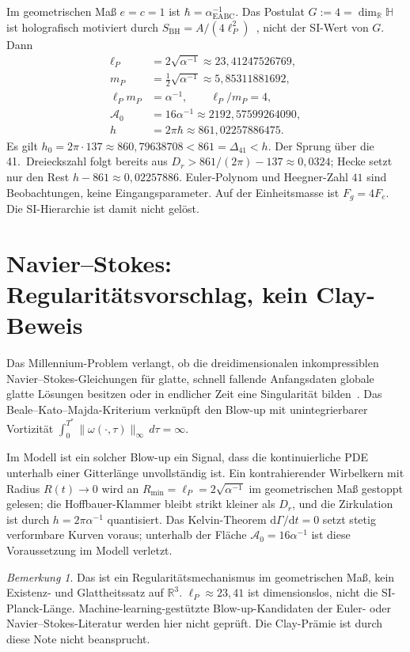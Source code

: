 \documentclass[11pt,a4paper]{article}
\theoremstyle{definition}
\theoremstyle{remark}
\newtheorem{remark}[theorem]{Bemerkung}
\numberwithin{equation}{section}
\begin{document}
Im geometrischen Maß $e=c=1$ ist $\hbar=\alpha^{-1}_{\mathrm{EABC}}$.
Das Postulat $G:=4=\dim_{\mathbb{R}}\mathbb{H}$ ist holografisch motiviert durch $S_{\mathrm{BH}}=A/(4\ell_P^2)$~\cite{bekenstein1973,hawking1975}, nicht der SI-Wert von $G$.
Dann
\begin{align}
\ell_P&=2\sqrt{\alpha^{-1}}\approx 23{,}41247526769,\\
m_P&=\tfrac12\sqrt{\alpha^{-1}}\approx 5{,}85311881692,\\
\ell_P m_P&=\alpha^{-1},\qquad \ell_P/m_P=4,\\
\mathcal{A}_0&=16\alpha^{-1}\approx 2192{,}57599264090,\\
h&=2\pi\hbar\approx 861{,}02257886475.
\end{align}
Es gilt $h_0=2\pi\cdot 137\approx 860{,}79638708<861=\Delta_{41}<h$.
Der Sprung über die 41.\ Dreieckszahl folgt bereits aus $D_r>861/(2\pi)-137\approx 0{,}0324$;
Hecke setzt nur den Rest $h-861\approx 0{,}02257886$.
Euler-Polynom und Heegner-Zahl $41$ sind Beobachtungen, keine Eingangsparameter.
Auf der Einheitsmasse ist $F_g=4F_e$.
Die SI-Hierarchie ist damit nicht gelöst.

\section{Navier--Stokes: Regularitätsvorschlag, kein Clay-Beweis}

Das Millennium-Problem verlangt, ob die dreidimensionalen inkompressiblen Navier--Stokes-Gleichungen für glatte, schnell fallende Anfangsdaten globale glatte Lösungen besitzen oder in endlicher Zeit eine Singularität bilden~\cite{fefferman2000,clay2000}.
Das Beale--Kato--Majda-Kriterium verknüpft den Blow-up mit unintegrierbarer Vortizität
$\int_0^{T^*}\|\omega(\cdot,\tau)\|_\infty\,d\tau=\infty$.

Im Modell ist ein solcher Blow-up ein Signal, dass die kontinuierliche PDE unterhalb einer Gitterlänge unvollständig ist.
Ein kontrahierender Wirbelkern mit Radius $R(t)\to 0$ wird an $R_{\min}=\ell_P=2\sqrt{\alpha^{-1}}$ im geometrischen Maß gestoppt gelesen;
die Hoffbauer-Klammer bleibt strikt kleiner als $D_r$, und die Zirkulation ist durch $h=2\pi\alpha^{-1}$ quantisiert.
Das Kelvin-Theorem $\mathrm{d}\Gamma/\mathrm{d}t=0$ setzt stetig verformbare Kurven voraus; unterhalb der Fläche $\mathcal{A}_0=16\alpha^{-1}$ ist diese Voraussetzung im Modell verletzt.

\begin{remark}
Das ist ein Regularitätsmechanismus im geometrischen Maß, kein Existenz- und Glattheitssatz auf $\mathbb{R}^3$.
$\ell_P\approx 23{,}41$ ist dimensionslos, nicht die SI-Planck-Länge.
Machine-learning-gestützte Blow-up-Kandidaten der Euler- oder Navier--Stokes-Literatur werden hier nicht geprüft.
Die Clay-Prämie ist durch diese Note nicht beansprucht.
\end{remark}
\end{document}

